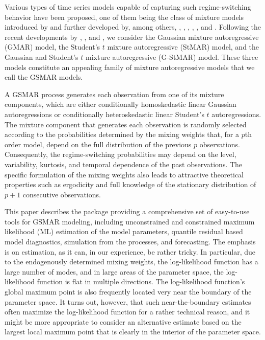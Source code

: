 \documentclass[nojss]{jss} %
\begin{document}
Various types of time series models capable of capturing such regime-switching behavior have been proposed, one of them being the class of mixture models introduced by \cite{Le+Martin+Raftery:1996} and further developed by, among others, \cite{Wong+Li:2000, Wong+Li:2001, Wong+Li2:2001}, \cite{Glasbey:2001}, \cite{Lanne+Saikkonen:2003}, \cite{Kalliovirta+Meitz+Saikkonen:2015}, \cite{Meitz+Preve+Saikkonen:2021}, and \cite{Virolainen:2020}. Following the recent developments by \cite{Kalliovirta+Meitz+Saikkonen:2015}, \cite{Meitz+Preve+Saikkonen:2021}, and \cite{Virolainen:2020}, we consider the Gaussian mixture autoregressive (GMAR) model, the Student's $t$ mixture autoregressive (StMAR) model, and the Gaussian and Student's $t$ mixture autoregressive (G-StMAR) model. These three models constitute an appealing family of mixture autoregressive models that we call the GSMAR models.

A GSMAR process generates each observation from one of its mixture components, which are either conditionally homoskedastic linear Gaussian autoregressions or conditionally heteroskedastic linear Student's $t$ autoregressions. The mixture component that generates each observation is randomly selected according to the probabilities determined by the mixing weights that, for a $p$th order model, depend on the full distribution of the previous $p$ observations. Consequently, the regime-switching probabilities may depend on the level, variability, kurtosis, and temporal dependence of the past observations. The specific formulation of the mixing weights also leads to attractive theoretical properties such as ergodicity and full knowledge of the stationary distribution of $p+1$ consecutive observations.

This paper describes the  package  providing a comprehensive set of easy-to-use tools for GSMAR modeling, including unconstrained and constrained maximum likelihood (ML) estimation of the model parameters, quantile residual based model diagnostics, simulation from the processes, and forecasting. The emphasis is on estimation, as it can, in our experience, be rather tricky. In particular, due to the endogenously determined mixing weights, the log-likelihood function has a large number of modes, and in large areas of the parameter space, the log-likelihood function is flat in multiple directions. The log-likelihood function's global maximum point is also frequently located very near the boundary of the parameter space. It turns out, however, that such near-the-boundary estimates often maximize the log-likelihood function for a rather technical reason, and it might be more appropriate to consider an alternative estimate based on the largest local maximum point that is clearly in the interior of the parameter space.
\end{document}
